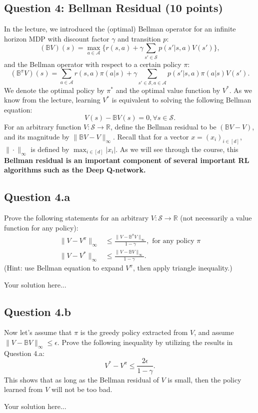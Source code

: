 \documentclass[12pt]{article}
\newcommand*{\bo}{\mathbb{B}}
\begin{document}
\subsection*{Question 4: Bellman Residual (10 points)}
In the lecture, we introduced the (optimal) Bellman operator for an infinite horizon MDP with discount factor $\gamma$ and transition $p$:
$$(\bo V)(s) = \max_{a\in\mathcal{A}} \bigg\{r(s,a) + \gamma \sum_{s'\in\mathcal{S}} p(s'|s,a) V(s')\bigg\},$$
and the Bellman operator with respect to a certain policy $\pi$:
$$(\bo^\pi V)(s) = \sum_{a\in\mathcal{A}} r(s,a)\pi(a|s)+ \gamma \sum_{s'\in\mathcal{S},a\in \mathcal{A}} p(s'|s,a)\pi(a|s) V(s').$$
We denote the optimal policy by $\pi^*$ and the optimal value function by $V^*$. As we know from the lecture, learning $V^*$ is equivalent to solving the following Bellman equation:
$$V(s) -\bo V(s) = 0, \forall s \in \mathcal{S}.$$
For an arbitrary function $V: \mathcal{S} \rightarrow \mathbb{R}$, define the Bellman residual to be $(\bo V - V ) $, and its magnitude by $\|\bo V - V \|_\infty$. Recall that for a vector $x = (x_i)_{i\in[d]}$, $\|\cdot\|_\infty$ is defined by $\max_{i\in[d]} |x_i|$. As we will see through the course, this \textbf{Bellman residual is an important component of several important RL algorithms such as the Deep Q-network. }
%
%
\subsection*{Question 4.a}Prove the following statements for an arbitrary $V: \mathcal{S} \rightarrow \mathbb{R}$ (not necessarily a value function for any policy):
\begin{align*}
    \|V - V^\pi \|_\infty &\leq \frac{\|V - \bo^\pi V\|_\infty}{1-\gamma}, \text{ for any policy } \pi\\
    \|V - V^* \|_\infty &\leq \frac{\|V - \bo V\|_\infty}{1-\gamma}.
\end{align*}
(Hint: use Bellman equation to expand $V^\pi$, then apply triangle inequality.)
\begin{solution}
    Your solution here...
\end{solution}
%
%
\subsection*{Question 4.b} Now let's assume that $\pi$ is the greedy policy extracted from $V$, and assume $\|V - \bo V\|_\infty \leq \epsilon$. Prove the following inequality by utilizing the results in Question 4.a: 
$$V^* - V^{\pi} \leq  \frac{2\epsilon}{1-\gamma}.$$
This shows that as long as the Bellman residual of $V$ is small, then the policy learned from $V$ will not be too bad. 
\begin{solution}
Your solution here...
\end{solution}
\end{document}
